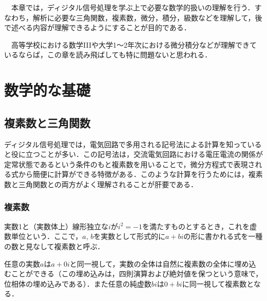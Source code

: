 
\begin{lead}
　本章では，ディジタル信号処理を学ぶ上で必要な数学的扱いの理解を行う．すなわち，解析に必要な三角関数，複素数，微分，積分，級数などを理解して，後で述べる内容が理解できるようにすることが目的である．

　高等学校における数学IIIや大学1～2年次における微分積分などが理解できているならば，この章を読み飛ばしても特に問題ないと思われる．



\end{lead}

\chapter{数学的な基礎}
\label{chapter:2}

\clearpage

\section{複素数と三角関数}

ディジタル信号処理では，電気回路で多用される記号法による計算を知っていると役に立つことが多い．この記号法は，交流電気回路における電圧電流の関係が定常状態であるという条件のもと複素数を用いることで，微分方程式で表現される式から簡便に計算ができる特徴がある．このような計算を行うためには，複素数と三角関数との両方がよく理解されることが肝要である．

\subsection{複素数}

実数1と（実数体上）線形独立な$i$が$i^2 = -1$を満たすものとするとき，これを虚数単位という．ここで，$a$, $b$を実数として形式的に$a + bi$の形に書かれる式を一種の数と見なして複素数と呼ぶ．

任意の実数$a$は$a + 0i$と同一視して，実数の全体は自然に複素数の全体に埋め込むことができる（この埋め込みは，四則演算および絶対値を保つという意味で，位相体の埋め込みである）．また任意の純虚数$bi$は$0 + bi$に同一視して複素数となる．


